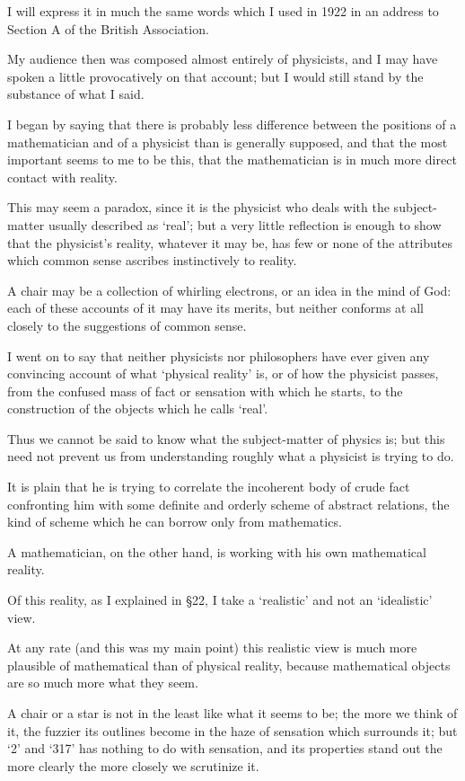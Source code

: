 \documentclass{article}
\numberwithin{equation}{section}
\begin{document}
I will express it in much the same words which I used in 1922 in an address to Section A of the British Association.

My audience then was composed almost entirely of physicists, and I may have spoken a little provocatively on that account; but I would still stand by the substance of what I said.

%
I began by saying that there is probably less difference between the positions of a mathematician and of a physicist than is generally supposed, and that the most important seems to me to be this, that the mathematician is in much more direct contact with reality.

This may seem a paradox, since it is the physicist who deals with the subject-matter usually described as `real'; but a very little reflection is enough to show that the physicist's reality, whatever it may be, has few or none of the attributes which common sense ascribes instinctively to reality.

A chair may be a collection of whirling electrons, or an idea in the mind of God: each of these accounts of it may have its merits, but neither conforms at all closely to the suggestions of common sense.

%
I went on to say that neither physicists nor philosophers have ever given any convincing account of what `physical reality' is, or of how the physicist passes, from the confused mass of fact or sensation with which he starts, to the construction of the objects which he calls `real'.

Thus we cannot be said to know what the subject-matter of physics is; but this need not prevent us from understanding roughly what a physicist is trying to do.

It is plain that he is trying to correlate the incoherent body of crude fact confronting him with some definite and orderly scheme of abstract relations, the kind of scheme which he can borrow only from mathematics.

%
A mathematician, on the other hand, is working with his own mathematical reality.

Of this reality, as I explained in \S22, I take a `realistic' and not an `idealistic' view.

At any rate (and this was my main point) this realistic view is much more plausible of mathematical than of physical reality, because mathematical objects are so much more what they seem.

A chair or a star is not in the least like what it seems to be; the more we think of it, the fuzzier its outlines become in the haze of sensation which surrounds it; but `2' and `317' has nothing to do with sensation, and its properties stand out the more clearly the more closely we scrutinize it.
\end{document}

